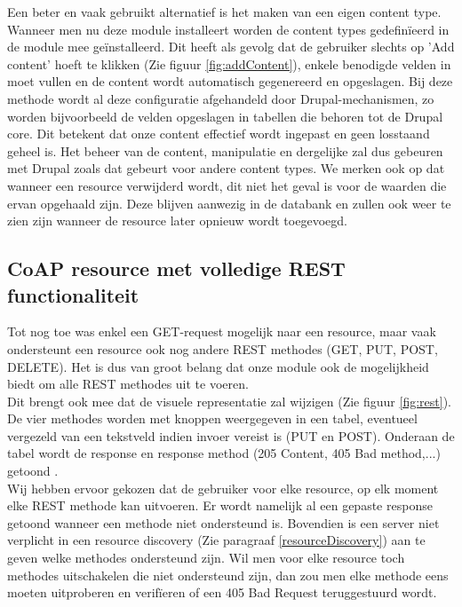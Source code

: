 Een beter en vaak gebruikt alternatief is het maken van een eigen content type. Wanneer men nu deze module installeert worden de content types gedefin\"{i}eerd in de module mee ge\"{i}nstalleerd. Dit heeft als gevolg dat de gebruiker slechts op 'Add content' hoeft te klikken (Zie figuur \ref{fig:addContent}), enkele benodigde velden in moet vullen en de content wordt automatisch gegenereerd en opgeslagen. Bij deze methode wordt al deze configuratie afgehandeld door Drupal-mechanismen, zo worden bijvoorbeeld de velden opgeslagen in tabellen die behoren tot de Drupal core. Dit betekent dat onze content effectief wordt ingepast en geen losstaand geheel is. Het beheer van de content, manipulatie en dergelijke zal dus gebeuren met Drupal zoals dat gebeurt voor andere content types. We merken ook op dat wanneer een resource verwijderd wordt, dit niet het geval is voor de waarden die ervan opgehaald zijn. Deze blijven aanwezig in de databank en zullen ook weer te zien zijn wanneer de resource later opnieuw wordt toegevoegd.\\

\subsection{CoAP resource met volledige REST functionaliteit} \label{rest}
Tot nog toe was enkel een GET-request mogelijk naar een resource, maar vaak ondersteunt een resource ook nog andere REST methodes (GET, PUT, POST, DELETE). Het is dus van groot belang dat onze module ook de mogelijkheid biedt om alle REST methodes uit te voeren.\\

Dit brengt ook mee dat de visuele representatie zal wijzigen (Zie figuur \ref{fig:rest}). De vier methodes worden met knoppen weergegeven in een tabel, eventueel vergezeld van een tekstveld indien invoer vereist is (PUT en POST). Onderaan de tabel wordt de response en response method (205 Content, 405 Bad method,...) getoond .\\
Wij hebben ervoor gekozen dat de gebruiker voor elke resource, op elk moment elke REST methode kan uitvoeren. Er wordt namelijk al een gepaste response getoond wanneer een methode niet ondersteund is. Bovendien is een server niet verplicht in een resource discovery (Zie paragraaf \ref{resourceDiscovery}) aan te geven welke methodes ondersteund zijn. Wil men voor elke resource toch methodes uitschakelen die niet ondersteund zijn, dan zou men elke methode eens moeten uitproberen en verif\"{i}eren of een 405 Bad Request teruggestuurd wordt.

